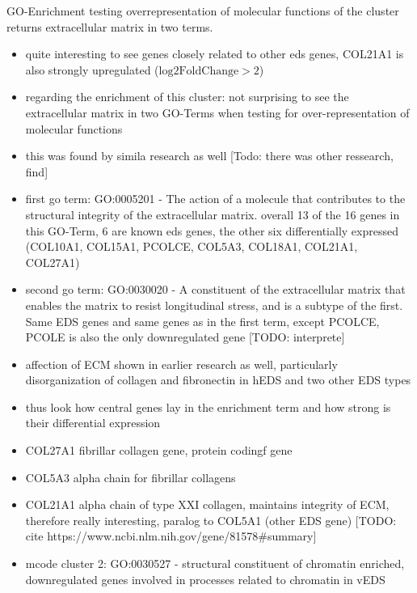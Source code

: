 GO-Enrichment testing overrepresentation of molecular functions of the cluster returns extracellular matrix in two terms.
\begin{itemize}
	\item quite interesting to see genes closely related to other eds genes, COL21A1 is also strongly upregulated ($\text{log2FoldChange} > 2$)
	\item regarding the enrichment of this cluster: not surprising to see the extracellular matrix in two GO-Terms when testing for over-representation of molecular functions
	\item this was found by simila research as well \cite{Ritelli2022} [Todo: there was other ressearch, find]
	\item first go term: GO:0005201 - The action of a molecule that contributes to the structural integrity of the extracellular matrix. overall 13 of the 16 genes in this GO-Term, 6 are known eds genes, the other six differentially expressed (COL10A1, COL15A1, PCOLCE, COL5A3, COL18A1, COL21A1, COL27A1)
	\item second go term: GO:0030020 - A constituent of the extracellular matrix that enables the matrix to resist longitudinal stress, and is a subtype of the first. Same EDS genes and same genes as in the first term, except PCOLCE, PCOLE is also the only downregulated gene [TODO: interprete]
	\item affection of ECM shown in earlier research as well, particularly disorganization of collagen and fibronectin in hEDS and two other EDS types \cite{Chiarelli2018}
	\item thus look how central genes lay in the enrichment term and how strong is their differential expression
	\item COL27A1 fibrillar collagen gene, protein codingf gene
	\item COL5A3 alpha chain for fibrillar collagens
	\item COL21A1 alpha chain of type XXI collagen, maintains integrity of ECM, therefore really interesting, paralog to COL5A1 (other EDS gene) [TODO: cite https://www.ncbi.nlm.nih.gov/gene/81578\#summary]
\end{itemize}

\begin{itemize}
	\item mcode cluster 2: 	GO:0030527 - structural constituent of chromatin enriched, downregulated genes involved in processes related to chromatin in vEDS \cite{Chiarelli2018}
\end{itemize}

